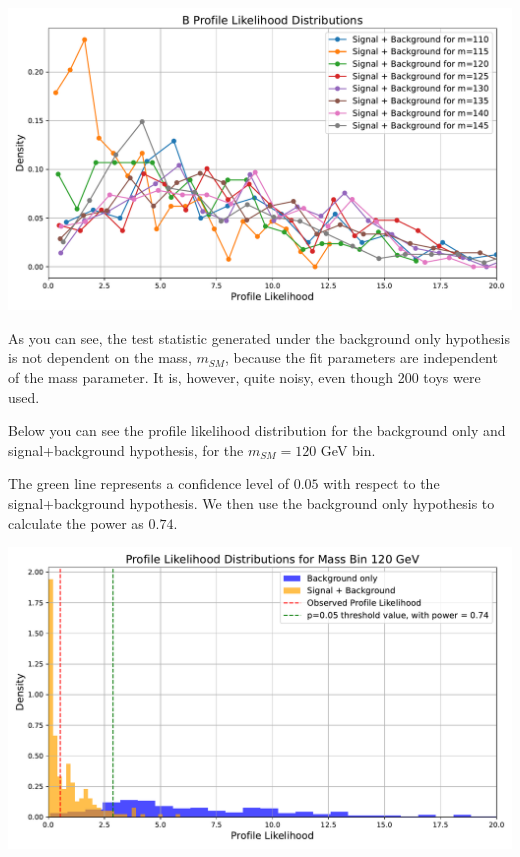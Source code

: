 \documentclass{6042}
\begin{document}
\begin{center}
    \includegraphics[scale=0.5]{images/cls_small_nsig22/cls_b_profile_likelihoods_mass_binned.pdf}
\end{center}

As you can see, the test statistic generated under the background only hypothesis is not dependent on the mass, $m_{SM}$, because the fit parameters are independent of the mass parameter. It is, however, quite noisy, even though 200 toys were used. 


Below you can see the profile likelihood distribution for the background only and signal+background hypothesis, for the $m_{SM} = 120$ GeV bin. 

The green line represents a confidence level of $0.05$ with respect to the signal+background hypothesis. We then use the background only hypothesis to calculate the power as $0.74$.

\begin{center}
    \includegraphics[scale=0.5]{images/cls_small_nsig22/cls_profile_liklihood_distribution_m=120.pdf}
\end{center}
\end{document}
